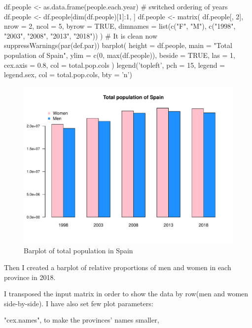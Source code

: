 \documentclass[12pt, oneside]{report}\usepackage[]{graphicx}\usepackage[]{color}
\begin{document}
\begin{Schunk}
\begin{Sinput}
df.people <- as.data.frame(people.each.year)
# switched ordering of years
df.people <- df.people[dim(df.people)[1]:1, ]
df.people <- matrix(
  df.people[, 2], 
  nrow = 2, 
  ncol = 5,
  byrow = TRUE,
  dimnames = list(c("F", "M"), c("1998", "2003", "2008", "2013", "2018"))
)
# It is clean now
suppressWarnings(par(def.par))
barplot(
  height = df.people, 
  main = "Total population of Spain", 
  ylim = c(0, max(df.people)), 
  beside = TRUE, 
  las = 1,
  cex.axis = 0.8,
  col = total.pop.cols
)
legend('topleft', pch = 15, legend = legend.sex, col = total.pop.cols, bty = 'n')
\end{Sinput}
\begin{figure}[h]

{\centering \includegraphics[width=.6\textheight,height=.45\textheight]{figure/unnamed-chunk-9-1} 

}

\caption[Barplot of total population in Spain]{Barplot of total population in Spain}\label{fig:unnamed-chunk-9}
\end{figure}
\end{Schunk}

\newpage
Then I created a barplot of relative proportions of men and women in each province in 2018. 

\noindent I transposed the input matrix in order to show the data by row(men and women side-by-side). I have also set few plot parameters: 

"cex.names", to make the provinces' names smaller, 
\end{document}

